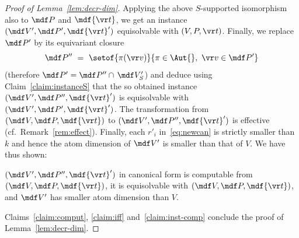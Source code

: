 \begin{proof}[Proof of Lemma~\ref{lem:decr-dim}]
Applying the above $S$-supported isomorphism also to $\mdf P$ and $\mdf {\vr t}$,
 we get an instance
$(\mdf V', \mdf P', \mdf{\vr t}')$ equisolvable with $(V, P, \vr t)$.
Finally, we replace $\mdf P'$ by its equivariant closure
\[
\mdf P'' \ = \ \setof{\pi(\vr v)}{\pi \in \Aut{}, \ \vr v \in \mdf P'}
\]
(therefore $\mdf P' = \mdf P'' \cap \, \mdf V'_S$)
and deduce using Claim~\ref{claim:instanceS} that
the so obtained instance $(\mdf V', \mdf P'', \mdf{\vr t}')$ 
is equisolvable with $(\mdf V', \mdf P', \mdf{\vr t}')$.
%
%
The transformation from  $(\mdf V, \mdf P, \mdf{\vr t})$ to $(\mdf V', \mdf P'', \mdf{\vr t}')$ is effective
(cf.~Remark~\ref{rem:effect}).
Finally, each $r'_i$ in~\eqref{eq:newcan} is strictly smaller than $k$ and hence the atom dimension of $\mdf V'$ 
is smaller than that of $V$.
We have thus shown:
%
\begin{claim}  \label{claim:inst-comp}
$(\mdf V', \mdf P'', \mdf {\vr t}')$ in canonical form is computable from $(\mdf V, \mdf P, \mdf{\vr t})$,  
it is equisolvable with $(\mdf V, \mdf P, \mdf{\vr t})$,
and $\mdf V'$ has smaller atom dimension than $V$.
\end{claim}


%


Claims~\ref{claim:comput}, \ref{claim:iff} and~\ref{claim:inst-comp}  conclude the proof of Lemma~\ref{lem:decr-dim}. %
%
\end{proof}



